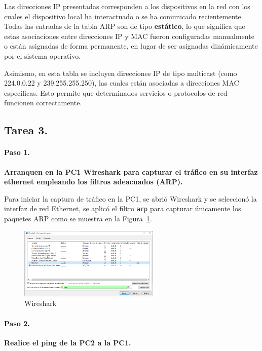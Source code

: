 \begin{enumerate}
            Las direcciones IP presentadas corresponden a los dispositivos en la red con los cuales el dispositivo local ha interactuado o se ha comunicado recientemente. Todas las entradas de la tabla ARP son de tipo \textbf{estático}, lo que significa que estas asociaciones entre direcciones IP y MAC fueron configuradas manualmente o están asignadas de forma permanente, en lugar de ser asignadas dinámicamente por el sistema operativo.
            
            Asimismo, en esta tabla se incluyen direcciones IP de tipo multicast (como 224.0.0.22 y 239.255.255.250), las cuales están asociadas a direcciones MAC específicas. Esto permite que determinados servicios o protocolos de red funcionen correctamente.

            
        \end{enumerate}
    \subsection{Tarea 3.}
        \paragraph{Paso 1.}
        \textbf{Arranquen en la PC1 \textbf{Wireshark} para capturar el tráfico en su interfaz ethernet empleando los filtros adeacuados (ARP).}

        Para iniciar la captura de tráfico en la PC1, se abrió Wireshark y se seleccionó la interfaz de red Ethernet, se aplicó el filtro \texttt{arp} para capturar únicamente los paquetes ARP como se muestra en la Figura~\ref{fig:wireshark}.

        \begin{figure}[H]
            \centering
            \includegraphics[width=0.6\textwidth]{img/Wireshark.PNG}
            \caption{Wireshark}
            \label{fig:wireshark}
        \end{figure}

    \paragraph{Paso 2.}
        \textbf{Realice el ping de la PC2 a la PC1.}


